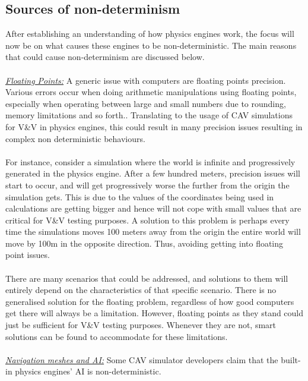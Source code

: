 \subsection{Sources of non-determinism}\label{nondeterminisimSources}
\noindent After establishing an understanding of how physics engines work, the focus will now be on what causes these engines to be non-deterministic. 
The main reasons that could cause non-determinism are discussed below. \\\\
\noindent\underline{\textit{Floating Points:}}
A generic issue with computers are floating points precision. 
Various errors occur when doing arithmetic manipulations using floating points, especially when operating between large and small numbers due to rounding, memory limitations and so forth.\cite{FloatingPointArithmeticArticle}\cite{FloatingPointsBook}. 
Translating to the usage of CAV simulations for V\&V in physics engines, this could result in many precision issues resulting in complex non deterministic behaviours.\\\\ 
\noindent For instance, consider a simulation where the world is infinite and progressively  generated in the physics engine. 
After a few hundred meters, precision issues will start to occur, and will get progressively worse the further from the origin the simulation gets. 
This is due to the values of the coordinates being used in calculations are getting bigger and hence will not cope with small values that are critical for V\&V testing purposes. 
A solution to this problem is perhaps every time the simulations moves 100 meters away from the origin the entire world will move by 100m in the opposite direction. Thus, avoiding getting into floating point issues.\cite{FloatingPointArithmeticArticle}\\\\
\noindent There are many scenarios that could be addressed, and solutions to them will entirely depend on the characteristics of that specific scenario. There is no generalised solution for the floating problem, regardless of how good computers get there will always be a limitation. However, floating points as they stand could just be sufficient for V\&V testing purposes. Whenever they are not, smart solutions can be found to accommodate for these limitations.\\\\
\noindent\underline{\textit{Navigation meshes and AI:}}
Some CAV simulator developers claim that the built-in physics engines' AI is non-deterministic\cite{CARLABenchmark}. 
